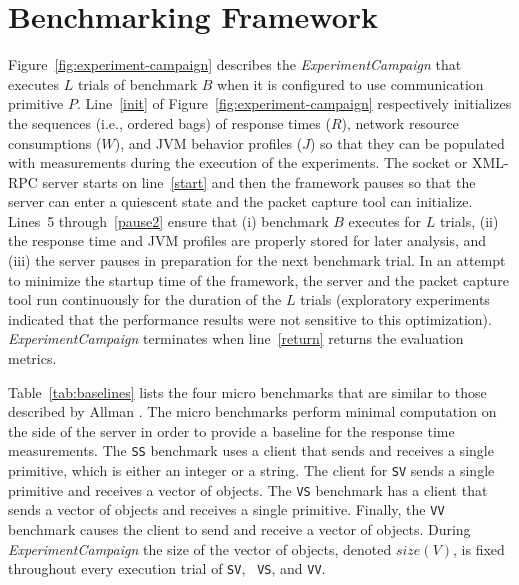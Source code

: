 \documentclass{sig-alternate}
\begin{document}

\vspace*{-.1in}

\section{Benchmarking Framework}
\label{sec:benchmark-framework}



Figure~\ref{fig:experiment-campaign} describes the {\em
  ExperimentCampaign} that executes $L$ trials of benchmark $B$ when
it is configured to use communication primitive $P$. Line~\ref{init}
of Figure~\ref{fig:experiment-campaign} respectively initializes the
sequences (i.e., ordered bags) of response times ($R$), network
resource consumptions ($W$), and JVM behavior profiles ($J$) so that
they can be populated with measurements during the execution of the
experiments.  The socket or XML-RPC server starts on line~\ref{start}
and then the framework pauses so that the server can enter a quiescent
state and the packet capture tool can initialize.  Lines~5
through~\ref{pause2} ensure that (i) benchmark $B$ executes for $L$
trials, (ii) the response time and JVM profiles are properly stored
for later analysis, and (iii) the server pauses in preparation for the
next benchmark trial.  In an attempt to minimize the startup time of
the framework, the server and the packet capture tool run continuously
for the duration of the $L$ trials (exploratory experiments indicated
that the performance results were not sensitive to this optimization).
{\em ExperimentCampaign} terminates when line~\ref{return} returns the
evaluation metrics.

Table~\ref{tab:baselines} lists the four micro benchmarks that are
similar to those described by Allman \cite{allman-per}. The micro
benchmarks perform minimal computation on the side of the server in
order to provide a baseline for the response time measurements.  The
\texttt{SS} benchmark uses a client that sends and receives a single
primitive, which is either an integer or a string.  The client for
\texttt{SV} sends a single primitive and receives a vector of objects.
The \texttt{VS} benchmark has a client that sends a vector of objects
and receives a single primitive.  Finally, the \texttt{VV} benchmark
causes the client to send and receive a vector of objects.  During
{\em ExperimentCampaign} the size of the vector of objects, denoted
$size(V)$, is fixed throughout every execution trial of {\tt SV}, {\tt
  VS}, and {\tt VV}.
\end{document}
